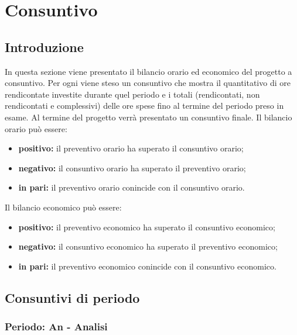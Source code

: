 
\section {Consuntivo}
	\subsection {Introduzione}
	In questa sezione viene presentato il bilancio orario ed economico del progetto a consuntivo. Per ogni  viene steso un consuntivo che mostra il quantitativo di ore rendicontate investite durante quel periodo e i totali (rendicontati, non rendicontati e complessivi) delle ore spese fino al termine del periodo preso in esame. Al termine del progetto verrà presentato un consuntivo finale.
	Il bilancio orario può essere:
	\begin{itemize}
	\item \textbf{positivo:} il preventivo orario ha superato il consuntivo orario;
	\item \textbf{negativo:} il consuntivo orario ha superato il preventivo orario;
	\item \textbf{in pari:} il preventivo orario conincide con il consuntivo orario.
	\end{itemize}
	Il bilancio economico può essere:
	\begin{itemize}
	\item \textbf{positivo:} il preventivo economico ha superato il consuntivo economico;
	\item \textbf{negativo:} il consuntivo economico ha superato il preventivo economico;
	\item \textbf{in pari:}  il preventivo economico conincide con il consuntivo economico.
	\end{itemize}
	
	\newpage
	\subsection {Consuntivi di periodo}
		\subsubsection {Periodo: An - Analisi}
